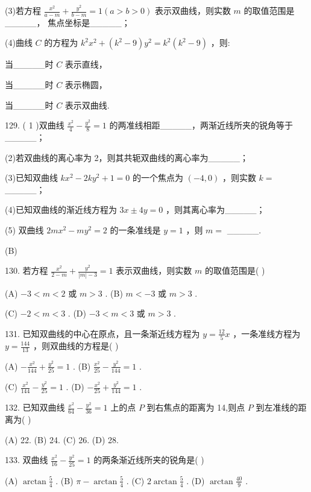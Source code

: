 \documentclass[10pt]{article}
\begin{document}
(3)若方程 \(\frac{{x}^{2}}{a - m} + \frac{{y}^{2}}{b - m} = 1\left( {a > b > 0}\right)\) 表示双曲线，则实数 \(m\) 的取值范围是\_\_\_\_\_， 焦点坐标是\_\_\_\_\_；

(4)曲线 \(C\) 的方程为 \({k}^{2}{x}^{2} + \left( {{k}^{2} - 9}\right) {y}^{2} = {k}^{2}\left( {{k}^{2} - 9}\right)\) ，则:

当\_\_\_\_\_时 \(C\) 表示直线，

当\_\_\_\_\_时 \(C\) 表示椭圆，

当\_\_\_\_\_时 \(C\) 表示双曲线.

129. ( 1 )双曲线 \(\frac{{x}^{2}}{4} - \frac{{y}^{2}}{8} = 1\) 的两准线相距\_\_\_\_\_，两渐近线所夹的锐角等于\_\_\_\_\_；

(2)若双曲线的离心率为 2，则其共轭双曲线的离心率为\_\_\_\_\_；

(3)已知双曲线 \(k{x}^{2} - {2k}{y}^{2} + 1 = 0\) 的一个焦点为 \(\left( {-4,0}\right)\) ，则实数 \(k =\) \_\_\_\_\_；

(4)已知双曲线的渐近线方程为 \({3x} \pm  {4y} = 0\) ，则其离心率为\_\_\_\_\_；

(5) 双曲线 \({2m}{x}^{2} - m{y}^{2} = 2\) 的一条准线是 \(y = 1\) ，则 \(m =\) \_\_\_\_\_.

(B)

130. 若方程 \(\frac{{x}^{2}}{2 - m} + \frac{{y}^{2}}{\left| m\right|  - 3} = 1\) 表示双曲线，则实数 \(m\) 的取值范围是( )

(A) \(- 3 < m < 2\) 或 \(m > 3\) . (B) \(m <  - 3\) 或 \(m > 3\) .

(C) \(- 2 < m < 3\) . (D) \(- 3 < m < 3\) 或 \(m > 3\) .

131. 已知双曲线的中心在原点，且一条渐近线方程为 \(y = \frac{12}{5}x\) ，一条准线方程为 \(y = \frac{144}{13}\) ，则双曲线的方程是( )

(A) \(- \frac{{x}^{2}}{144} + \frac{{y}^{2}}{25} = 1\) . (B) \(\frac{{x}^{2}}{25} - \frac{{y}^{2}}{144} = 1\) .

(C) \(\frac{{x}^{2}}{144} - \frac{{y}^{2}}{25} = 1\) . (D) \(- \frac{{x}^{2}}{25} + \frac{{y}^{2}}{144} = 1\) .

132. 已知双曲线 \(\frac{{x}^{2}}{64} - \frac{{y}^{2}}{36} = 1\) 上的点 \(P\) 到右焦点的距离为 14,则点 \(P\) 到左准线的距离为( )

(A) 22. (B) 24. (C) 26. (D) 28.

133. 双曲线 \(\frac{{x}^{2}}{16} - \frac{{y}^{2}}{25} = 1\) 的两条渐近线所夹的锐角是( )

(A) \(\arctan \frac{5}{4}\) . (B) \(\pi  - \arctan \frac{5}{4}\) . (C) \(2\arctan \frac{5}{4}\) . (D) \(\arctan \frac{40}{9}\) .
\end{document}
